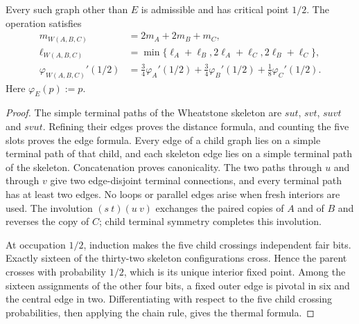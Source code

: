 \begin{lemma}\label{lem:wheatstone-responses}
Every such graph other than $E$ is admissible and has critical point $1/2$. The operation satisfies
\begin{align*}
 m_{W(A,B,C)}&=2m_A+2m_B+m_C,\\
 \ell_{W(A,B,C)}&=\min\{\ell_A+\ell_B,2\ell_A+\ell_C,2\ell_B+\ell_C\},\\
 \varphi_{W(A,B,C)}'(1/2)
 &=\tfrac34\varphi_A'(1/2)+\tfrac34\varphi_B'(1/2)+\tfrac18\varphi_C'(1/2).
\end{align*}
Here $\varphi_E(p):=p$.
\end{lemma}
\begin{proof}
The simple terminal paths of the Wheatstone skeleton are $sut$, $svt$, $suvt$ and $svut$. Refining their edges proves the distance formula, and counting the five slots proves the edge formula. Every edge of a child graph lies on a simple terminal path of that child, and each skeleton edge lies on a simple terminal path of the skeleton. Concatenation proves canonicality. The two paths through $u$ and through $v$ give two edge-disjoint terminal connections, and every terminal path has at least two edges. No loops or parallel edges arise when fresh interiors are used. The involution $(s\ t)(u\ v)$ exchanges the paired copies of $A$ and of $B$ and reverses the copy of $C$; child terminal symmetry completes this involution.

At occupation $1/2$, induction makes the five child crossings independent fair bits. Exactly sixteen of the thirty-two skeleton configurations cross. Hence the parent crosses with probability $1/2$, which is its unique interior fixed point. Among the sixteen assignments of the other four bits, a fixed outer edge is pivotal in six and the central edge in two. Differentiating with respect to the five child crossing probabilities, then applying the chain rule, gives the thermal formula.
\end{proof}

